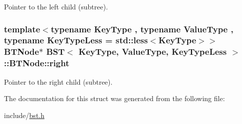 Pointer to the left child (subtree). 

\subsubsection[{\texorpdfstring{right}{right}}]{\setlength{\rightskip}{0pt plus 5cm}template$<$typename Key\+Type , typename Value\+Type , typename Key\+Type\+Less  = std\+::less$<$\+Key\+Type$>$$>$ {\bf B\+T\+Node}$\ast$ {\bf B\+ST}$<$ Key\+Type, Value\+Type, Key\+Type\+Less $>$\+::B\+T\+Node\+::right}\hypertarget{struct_b_s_t_1_1_b_t_node_ac37767e7aed3f971b045bcf18728bbac}{}\label{struct_b_s_t_1_1_b_t_node_ac37767e7aed3f971b045bcf18728bbac}


Pointer to the right child (subtree). 



The documentation for this struct was generated from the following file\+:\begin{DoxyCompactItemize}
\item 
include/\hyperlink{bst_8h}{bst.\+h}\end{DoxyCompactItemize}
